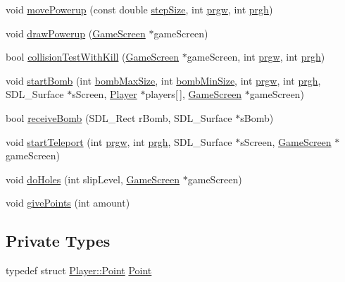 \begin{DoxyCompactItemize}
\item 
void \hyperlink{classPlayer_a0af465a4f6909c99efb995c300957f30}{move\+Powerup} (const double \hyperlink{main_8cpp_a707dc5532cee7444ea37a95fdf2bd851}{step\+Size}, int \hyperlink{main_8cpp_ad1e84142b0bcc502ca72ba239e8b7712}{prgw}, int \hyperlink{main_8cpp_a16fb66a2b03f119d60e570f8bf24570e}{prgh})
\item 
void \hyperlink{classPlayer_a5498df59e9ac57670374dfea152b3eb6}{draw\+Powerup} (\hyperlink{classGameScreen}{Game\+Screen} $\ast$game\+Screen)
\item 
bool \hyperlink{classPlayer_a657c06ea85f2575144eb8f1ff5bd8f3c}{collision\+Test\+With\+Kill} (\hyperlink{classGameScreen}{Game\+Screen} $\ast$game\+Screen, int \hyperlink{main_8cpp_ad1e84142b0bcc502ca72ba239e8b7712}{prgw}, int \hyperlink{main_8cpp_a16fb66a2b03f119d60e570f8bf24570e}{prgh})
\item 
void \hyperlink{classPlayer_ad3e3c485bf4b312224004df1ce885a5e}{start\+Bomb} (int \hyperlink{main_8cpp_affaabf8fc47a7dd9262d94ed15876bea}{bomb\+Max\+Size}, int \hyperlink{main_8cpp_a977983348b076a15b137a0f4c8340312}{bomb\+Min\+Size}, int \hyperlink{main_8cpp_ad1e84142b0bcc502ca72ba239e8b7712}{prgw}, int \hyperlink{main_8cpp_a16fb66a2b03f119d60e570f8bf24570e}{prgh}, S\+D\+L\+\_\+\+Surface $\ast$s\+Screen, \hyperlink{classPlayer}{Player} $\ast$players\mbox{[}$\,$\mbox{]}, \hyperlink{classGameScreen}{Game\+Screen} $\ast$game\+Screen)
\item 
bool \hyperlink{classPlayer_aea722aeaf4b9238277840ac21aab7a1c}{receive\+Bomb} (S\+D\+L\+\_\+\+Rect r\+Bomb, S\+D\+L\+\_\+\+Surface $\ast$s\+Bomb)
\item 
void \hyperlink{classPlayer_ad263fe7e1919ef5af34bc8aa00bb796f}{start\+Teleport} (int \hyperlink{main_8cpp_ad1e84142b0bcc502ca72ba239e8b7712}{prgw}, int \hyperlink{main_8cpp_a16fb66a2b03f119d60e570f8bf24570e}{prgh}, S\+D\+L\+\_\+\+Surface $\ast$s\+Screen, \hyperlink{classGameScreen}{Game\+Screen} $\ast$game\+Screen)
\item 
void \hyperlink{classPlayer_a177f47a7c0da1bb95931850ceb9e595e}{do\+Holes} (int slip\+Level, \hyperlink{classGameScreen}{Game\+Screen} $\ast$game\+Screen)
\item 
void \hyperlink{classPlayer_a8180d4f29088fa59d1b592d9fe981c16}{give\+Points} (int amount)
\end{DoxyCompactItemize}
\subsection*{Private Types}
\begin{DoxyCompactItemize}
\item 
typedef struct \hyperlink{structPlayer_1_1Point}{Player\+::\+Point} \hyperlink{classPlayer_a9a42f90c20c3a394c3c3dab176b8c9a0}{Point}
\end{DoxyCompactItemize}
